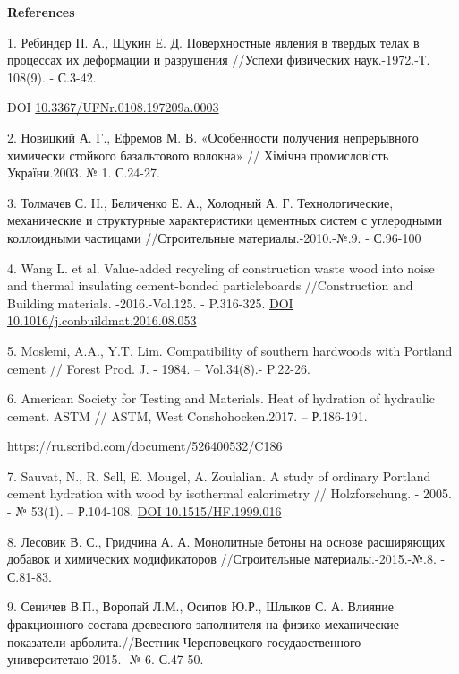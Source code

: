 {\bfseries References}

1. Ребиндер П. А., Щукин Е. Д. Поверхностные явления в твердых телах в
процессах их деформации и разрушения //Успехи физических наук.-1972.-Т.
108(9). - С.3-42.

DOI
\href{https://doi.org/10.3367/UFNr.0108.197209a.0003}{10.3367/UFNr.0108.197209a.0003}

2. Новицкий А. Г., Ефремов М. В. «Особенности получения непрерывного
химически стойкого базальтового волокна» // Хімічна промисловість
України.2003. № 1. С.24-27.
\href{https://novitsky1.narod.ru/basalt5.htm}{}

3. Толмачев С. Н., Беличенко Е. А., Холодный А. Г. Технологические,
механические и структурные характеристики цементных систем с углеродными
коллоидными частицами //Строительные материалы.-2010.-№.9. - С.96-100

\href{https://cyberleninka.ru/article/n/tehnologicheskie-mehanicheskie-i-strukturnye-harakteristiki-tsementnyh-sistem-s-uglerodnymi-kolloidnymi-chastitsami}{}

4. Wang L. et al. Value-added recycling of construction waste wood into
noise and thermal insulating cement-bonded particleboards //Construction
and Building materials. -2016.-Vol.125. - P.316-325.
\href{https://doi.org/10.1016/j.conbuildmat.2016.08.053}{DOI
10.1016/j.conbuildmat.2016.08.053}

5. Moslemi, A.A., Y.T. Lim. Compatibility of southern hardwoods with
Portland cement // Forest Prod. J. - 1984. -- Vol.34(8).- P.22-26.

6. American Society for Testing and Materials. Heat of hydration of
hydraulic cement. ASTM // ASTM, West Conshohocken.2017. -- Р.186-191.

https://ru.scribd.com/document/526400532/C186

7. Sauvat, N., R. Sell, E. Mougel, A. Zoulalian. A study of ordinary
Portland cement hydration with wood by isothermal calorimetry //
Holzforschung. - 2005. - № 53(1). -- Р.104-108.
\href{https://doi.org/10.1515/HF.1999.016}{DOI 10.1515/HF.1999.016}

8. Лесовик В. С., Гридчина А. А. Монолитные бетоны на основе расширяющих
добавок и химических модификаторов //Строительные материалы.-2015.-№.8.
- С.81-83.

9. Сеничев В.П., Воропай Л.М., Осипов Ю.Р., Шлыков С. А. Влияние
фракционного состава древесного заполнителя на физико-механические
показатели арболита.//Вестник Череповецкого госудаоственного
университетаю-2015.- № 6.-С.47-50.

